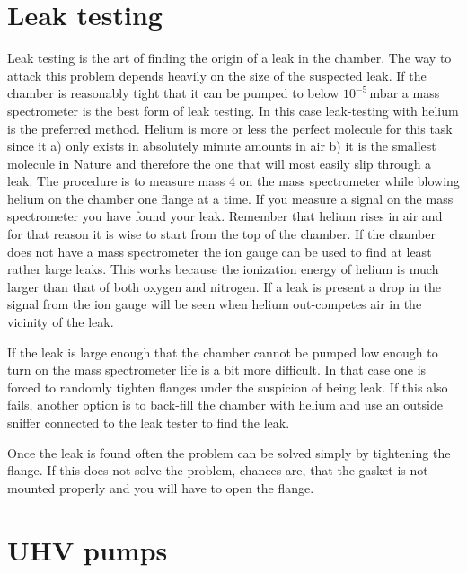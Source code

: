 \documentclass[a4paper,english]{article}
\begin{document}
\section{Leak testing}
Leak testing is the art of finding the origin of a leak in the chamber. The way to attack this problem depends heavily on the size of the suspected leak. If the chamber is reasonably tight that it can be pumped to below $10^{-5}$\,mbar a mass spectrometer is the best form of leak testing. In this case leak-testing with helium is the preferred method. Helium is more or less the perfect molecule for this task since it a) only exists in absolutely minute amounts in air b) it is the smallest molecule in Nature and therefore the one that will most easily slip through a leak. The procedure is to measure mass 4 on the mass spectrometer while blowing helium on the chamber one flange at a time. If you measure a signal on the mass spectrometer you have found your leak. Remember that helium rises in air and for that reason it is wise to start from the top of the chamber. If the chamber does not have a mass spectrometer the ion gauge can be used to find at least rather large leaks. This works because the ionization energy of helium is much larger than that of both oxygen and nitrogen. If a leak is present a drop in the signal from the ion gauge will be seen when helium out-competes air in the vicinity of the leak.

If the leak is large enough that the chamber cannot be pumped low enough to turn on the mass spectrometer life is a bit more difficult. In that case one is forced to randomly tighten flanges under the suspicion of being leak. If this also fails, another option is to back-fill the chamber with helium and use an outside sniffer connected to the leak tester to find the leak.

Once the leak is found often the problem can be solved simply by tightening the flange. If this does not solve the problem, chances are, that the gasket is not mounted properly and you will have to open the flange.  

\section{UHV pumps}
\end{document}
